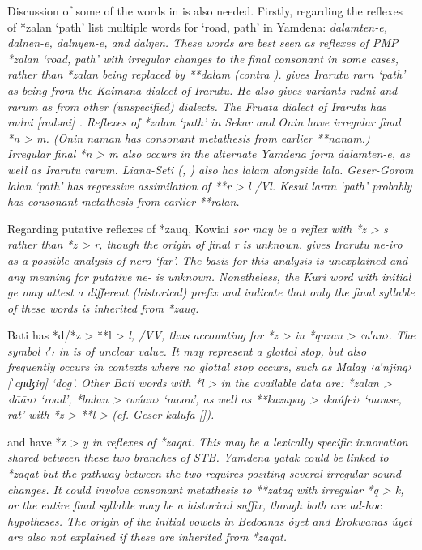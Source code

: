 Discussion of some of the words in  is also needed.
Firstly, regarding the reflexes of *zalan ‘path’
\citet{MettlerMettler1996} list multiple words for ‘road,
path’ in Yamdena: \it{dalamten-e,
dalnen-e, dalnyen-e,} and \it{dalŋen}.
These words are best seen as reflexes of PMP *zalan ‘road,
path’ with irregular changes to the final consonant in some cases,
rather than *zalan being replaced by **dalam (contra \citealt[276]{Blust1993}).
\citet[226]{Jackson2014} gives Irarutu \it{rarn} ‘path’ as being
from the Kaimana dialect of Irarutu.
He also gives variants \it{radni}
and \it{rarum} as from other (unspecified) dialects.
The Fruata dialect of Irarutu has \it{radni} [radəni] \citep{Voorhoeve1995b}.
Reflexes of *zalan ‘path’ in Sekar
and Onin have irregular final *n > \it{m}.
(Onin \it{naman} has consonant metathesis from earlier **nanam.)
Irregular final *n > \it{m} also occurs in the alternate Yamdena
form \it{dalamten-e}, as well as Irarutu \it{rarum}.
Liana-Seti (, ) also has \it{lalam} alongside \it{lala}.
Geser-Gorom \it{lalan} ‘path’ has regressive assimilation of
**r > \it{l} /{\gap}Vl.
Kesui \it{laran} ‘path’ probably has consonant metathesis from earlier **ralan.

Regarding putative reflexes of *zauq,
Kowiai \it{sor} may be a reflex with *z > \it{s} rather than
*z > \it{r}, though the origin of final \it{r} is unknown.
\citet[112]{Jackson2014} gives Irarutu \it{ne-iro} as a possible
analysis of \it{nero} ‘far’.
The basis for this analysis is unexplained
and any meaning for putative \it{ne-} is unknown.
Nonetheless, the Kuri word with initial \it{ge} may attest a
different (historical) prefix and indicate that only the
final syllable of these words is inherited from *zauq.

Bati has *d/*z > **l > \it{l,} {\0} /V{\gap}V,
thus accounting for *z > {\0} in *quzan > ‹u′an›.
The symbol ‹′› in \citet{Wallace1869} is of unclear value.
It may represent a glottal stop,
but also frequently occurs in contexts where no glottal stop
occurs, such as Malay ‹a′njing› [ˈaɲʤiŋ] ‘dog’.
Other Bati words with *l > {\0} in the available data are: *zalan
> ‹\it{lāān}› ‘road’, *bulan > ‹wúan› ‘moon’,
as well as **kazupay > ‹kaúfei› ‘mouse,
rat’ with *z > **l > {\0} (cf.
Geser \it{kalufa} [\citealp[144]{Collins1986}]).

 and  have *z > \it{y} in reflexes of *zaqat.
This may be a lexically specific innovation shared between these
two branches of STB.
Yamdena \it{yatak} could be linked to *zaqat but the pathway
between the two requires positing several irregular sound changes.
It could involve consonant metathesis to **zataq with irregular
*q > \it{k}, or the entire final syllable may be a historical suffix,
though both are ad-hoc hypotheses.
The origin of the initial vowels in Bedoanas \it{óyet}
and Erokwanas \it{úyet} are also not explained if these are inherited from *zaqat.

